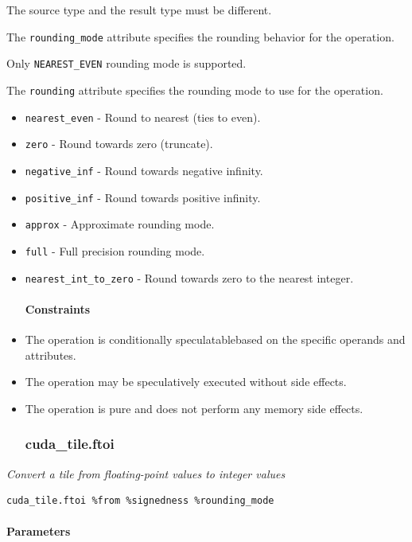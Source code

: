 \documentclass{article}
\begin{document}
The source type and the result type must be different.


The \texttt{rounding\_mode} attribute specifies the rounding behavior for the operation.

Only \texttt{NEAREST\_EVEN} rounding mode is supported.


The \texttt{rounding} attribute specifies the rounding mode to use for the operation.


\begin{itemize}
\item \texttt{nearest\_even} - Round to nearest (ties to even).
\item \texttt{zero} - Round towards zero (truncate).
\item \texttt{negative\_inf} - Round towards negative infinity.
\item \texttt{positive\_inf} - Round towards positive infinity.
\item \texttt{approx} - Approximate rounding mode.
\item \texttt{full} - Full precision rounding mode.
\item \texttt{nearest\_int\_to\_zero} - Round towards zero to the nearest integer.


\paragraph{Constraints}

\item The operation is conditionally speculatablebased on the specific operands and attributes.
\item The operation may be speculatively executed without side effects.
\item The operation is pure and does not perform any memory side effects.


\subsubsection{cuda\_tile.ftoi}

\end{itemize}
\textit{Convert a tile from floating-point values to integer values}


\begin{lstlisting}
cuda_tile.ftoi %from %signedness %rounding_mode
\end{lstlisting}

\paragraph{Parameters}
\end{document}
